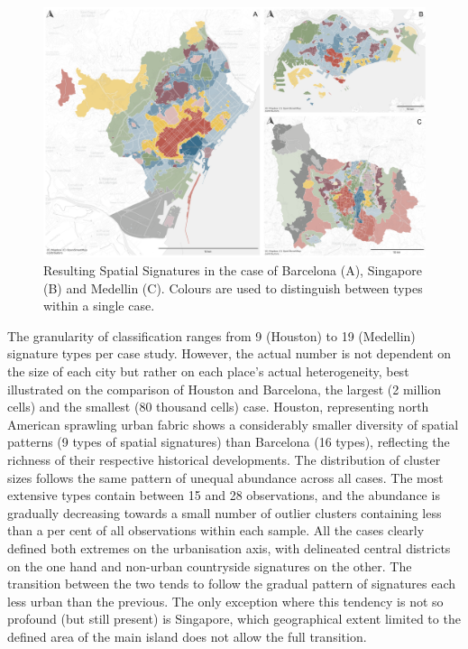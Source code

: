 \begin{figure}
    \includegraphics[width=\linewidth]{figures/maps1.png}
    \caption{Resulting Spatial Signatures in the case of Barcelona (A), Singapore (B)
    and Medellin (C). Colours are used to distinguish between types within a single case.}
    \label{fig:maps1}
\end{figure}

The granularity of classification ranges from 9 (Houston) to 19 (Medellin) signature
types per case study. However, the actual number is not dependent on the size of each
city but rather on each place's actual heterogeneity, best illustrated on the comparison
of Houston and Barcelona, the largest (2 million cells) and the smallest (80 thousand
cells) case. Houston, representing north American sprawling urban fabric shows a
considerably smaller diversity of spatial patterns (9 types of spatial signatures) than
Barcelona (16 types), reflecting the richness of their respective historical
developments.
The distribution of cluster sizes follows the same pattern of unequal abundance across
all cases. The most extensive types contain between 15 and 28%
observations, and the abundance is gradually decreasing towards a small number of
outlier clusters containing less than a per cent of all observations within each sample.
All the cases clearly defined both extremes on the urbanisation axis, with delineated
central districts on the one hand and non-urban countryside signatures on the other. The
transition between the two tends to follow the gradual pattern of signatures each less
urban than the previous. The only exception where this tendency is not so profound (but
still present) is Singapore, which geographical extent limited to the defined area of
the main island does not allow the full transition.

